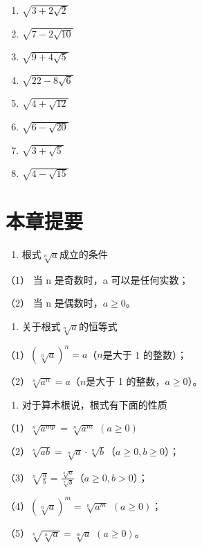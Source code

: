 \begin{enumerate}[start=1]
\item
  \(\sqrt{3 + 2\sqrt{2}}\)
\item
  \(\sqrt{7 - 2\sqrt{10}}\)
\item
  \(\sqrt{9 + 4\sqrt{5}}\)
\item
  \(\sqrt{22 - 8\sqrt{6}}\)
\item
  \(\sqrt{4 + \sqrt{12}}\)
\item
  \(\sqrt{6 - \sqrt{20}}\)
\item
  \(\sqrt{3 + \sqrt{5}}\)
\item
  \(\sqrt{4 - \sqrt{15}}\)
\end{enumerate}

\section{本章提要}

\begin{enumerate}
\item
  根式\(\sqrt[n]{a}\)成立的条件
\end{enumerate}

（1） 当 n 是奇数时，a 可以是任何实数；

（2） 当 n 是偶数时，\(a \geqslant 0\)。

\begin{enumerate}[start=2]
\item
  关于根式\(\sqrt[n]{a}\)的恒等式
\end{enumerate}

（1）\((\sqrt[n]{a})^n = a\)（\(n\)是大于 1 的整数）；

（2）\(\sqrt[n]{a^n} = a\)（\(n\)是大于 1 的整数，\(a \geqslant 0\)）。

\begin{enumerate}[start=3]
\item
  对于算术根说，根式有下面的性质
\end{enumerate}

（1）\(\sqrt[n]{a^{m p}} = \sqrt[n]{a^m}\) \((a\geqslant 0)\)

（2）\(\sqrt[n]{ab} = \sqrt[n]{a} \cdot \sqrt[n]{b}\)（\(a \geqslant 0, b \geqslant 0\)）；

（3）\(\sqrt[n]{\frac{a}{b}} = \frac{\sqrt[n]{a}}{\sqrt[n]{b}}\)（\(a \geqslant 0, b > 0\)）；

（4）\((\sqrt[n]{a})^m = \sqrt[n]{a^m}\) \((a \geqslant 0)\)；

（5）\(\sqrt[n]{\sqrt[n]{a}} = \sqrt[m]{a}\) \((a \geqslant 0)\)。

